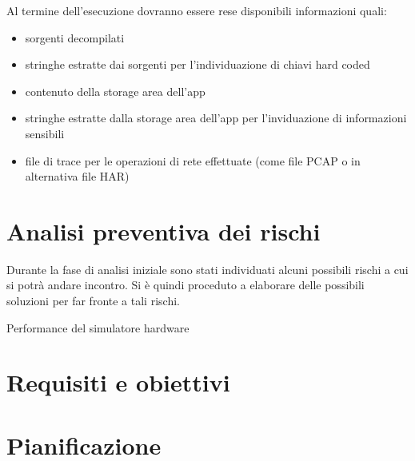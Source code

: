 Al termine dell'esecuzione dovranno essere rese disponibili informazioni quali:
\begin{itemize}
    \setlength\itemsep{0.1em}
    \item sorgenti decompilati
    \item stringhe estratte dai sorgenti per l'individuazione di chiavi hard coded
    \item contenuto della storage area dell'app
    \item stringhe estratte dalla storage area dell'app per l'inviduazione di informazioni sensibili
    \item file di trace per le operazioni di rete effettuate (come file PCAP o in alternativa file HAR)
\end{itemize}
\section{Analisi preventiva dei rischi}

Durante la fase di analisi iniziale sono stati individuati alcuni possibili rischi a cui si potrà andare incontro.
Si è quindi proceduto a elaborare delle possibili soluzioni per far fronte a tali rischi.\\

\begin{risk}{Performance del simulatore hardware}
    \label{risk:hardware-simulator} 
\end{risk}

\section{Requisiti e obiettivi}


\section{Pianificazione}
